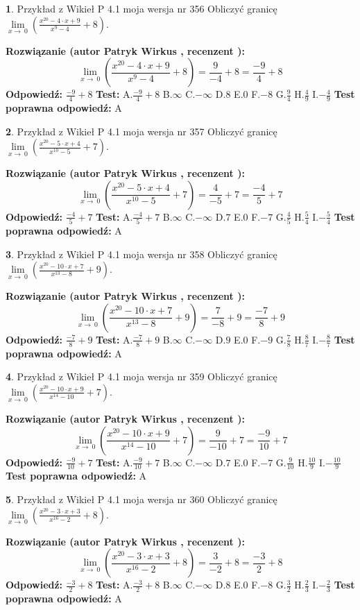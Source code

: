 \documentclass[12pt, a4paper]{article}
\theoremstyle{definition} %
\newtheorem{zad}{}
\newcommand{\zadStart}[1]{\begin{zad}#1\newline}
\newcommand{\zadStop}{\end{zad}}
\newcommand{\rozwStart}[2]{\noindent \textbf{Rozwiązanie (autor #1 , recenzent #2): }\newline}
\newcommand{\rozwStop}{\newline}
\newcommand{\odpStart}{\noindent \textbf{Odpowiedź:}\newline}
\newcommand{\odpStop}{\newline}
\newcommand{\testStart}{\noindent \textbf{Test:}\newline}
\newcommand{\testStop}{\newline}
\newcommand{\kluczStart}{\noindent \textbf{Test poprawna odpowiedź:}\newline}
\newcommand{\kluczStop}{\newline}
\begin{document}
\zadStart{Przykład z Wikieł P 4.1 moja wersja nr 356}
Obliczyć granicę $\lim\limits_{x\to\ 0}(\frac{x^{20}-4 \cdot x +9}{x^{9}-4}+8)$.
\zadStop
\rozwStart{Patryk Wirkus}{}
$$\lim\limits_{x\to\ 0}(\frac{x^{20}-4 \cdot x +9}{x^{9}-4}+8)=\frac{9}{-4}+8=\frac{-9}{4}+8$$
\rozwStop
\odpStart
$\frac{-9}{4}+8$
\odpStop
\testStart
A.$\frac{-9}{4}+8$
B.$\infty$
C.$-\infty$
D.$8$
E.$0$
F.$-8$
G.$\frac{9}{4}$
H.$\frac{4}{9}$
I.$-\frac{4}{9}$
\testStop
\kluczStart
A
\kluczStop



\zadStart{Przykład z Wikieł P 4.1 moja wersja nr 357}
Obliczyć granicę $\lim\limits_{x\to\ 0}(\frac{x^{20}-5 \cdot x +4}{x^{10}-5}+7)$.
\zadStop
\rozwStart{Patryk Wirkus}{}
$$\lim\limits_{x\to\ 0}(\frac{x^{20}-5 \cdot x +4}{x^{10}-5}+7)=\frac{4}{-5}+7=\frac{-4}{5}+7$$
\rozwStop
\odpStart
$\frac{-4}{5}+7$
\odpStop
\testStart
A.$\frac{-4}{5}+7$
B.$\infty$
C.$-\infty$
D.$7$
E.$0$
F.$-7$
G.$\frac{4}{5}$
H.$\frac{5}{4}$
I.$-\frac{5}{4}$
\testStop
\kluczStart
A
\kluczStop



\zadStart{Przykład z Wikieł P 4.1 moja wersja nr 358}
Obliczyć granicę $\lim\limits_{x\to\ 0}(\frac{x^{20}-10 \cdot x +7}{x^{13}-8}+9)$.
\zadStop
\rozwStart{Patryk Wirkus}{}
$$\lim\limits_{x\to\ 0}(\frac{x^{20}-10 \cdot x +7}{x^{13}-8}+9)=\frac{7}{-8}+9=\frac{-7}{8}+9$$
\rozwStop
\odpStart
$\frac{-7}{8}+9$
\odpStop
\testStart
A.$\frac{-7}{8}+9$
B.$\infty$
C.$-\infty$
D.$9$
E.$0$
F.$-9$
G.$\frac{7}{8}$
H.$\frac{8}{7}$
I.$-\frac{8}{7}$
\testStop
\kluczStart
A
\kluczStop



\zadStart{Przykład z Wikieł P 4.1 moja wersja nr 359}
Obliczyć granicę $\lim\limits_{x\to\ 0}(\frac{x^{20}-10 \cdot x +9}{x^{14}-10}+7)$.
\zadStop
\rozwStart{Patryk Wirkus}{}
$$\lim\limits_{x\to\ 0}(\frac{x^{20}-10 \cdot x +9}{x^{14}-10}+7)=\frac{9}{-10}+7=\frac{-9}{10}+7$$
\rozwStop
\odpStart
$\frac{-9}{10}+7$
\odpStop
\testStart
A.$\frac{-9}{10}+7$
B.$\infty$
C.$-\infty$
D.$7$
E.$0$
F.$-7$
G.$\frac{9}{10}$
H.$\frac{10}{9}$
I.$-\frac{10}{9}$
\testStop
\kluczStart
A
\kluczStop



\zadStart{Przykład z Wikieł P 4.1 moja wersja nr 360}
Obliczyć granicę $\lim\limits_{x\to\ 0}(\frac{x^{20}-3 \cdot x +3}{x^{16}-2}+8)$.
\zadStop
\rozwStart{Patryk Wirkus}{}
$$\lim\limits_{x\to\ 0}(\frac{x^{20}-3 \cdot x +3}{x^{16}-2}+8)=\frac{3}{-2}+8=\frac{-3}{2}+8$$
\rozwStop
\odpStart
$\frac{-3}{2}+8$
\odpStop
\testStart
A.$\frac{-3}{2}+8$
B.$\infty$
C.$-\infty$
D.$8$
E.$0$
F.$-8$
G.$\frac{3}{2}$
H.$\frac{2}{3}$
I.$-\frac{2}{3}$
\testStop
\kluczStart
A
\kluczStop
\end{document}

